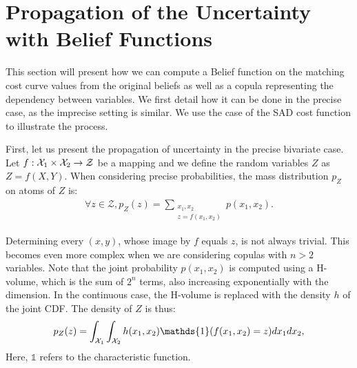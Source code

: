 \section{Propagation of the Uncertainty with Belief Functions}
This section  will present how we can compute a Belief function on the matching cost curve values from the original beliefs as well as a copula representing the dependency between variables. We first detail how it can be done in the precise case, as the imprecise setting is similar. We use the case of the SAD cost function to illustrate the process.

First, let us present the propagation of uncertainty in the precise bivariate case. Let $f:{\mathcal{X}}_1\times{\mathcal{X}}_2\rightarrow\mathcal{Z}$ be a mapping and we define the random variables $Z$ as $Z=f(X,Y)$. 
When considering precise probabilities, the mass distribution $p_Z$ on atoms of $Z$ is:
\begin{align}
    \forall z\in\mathcal{Z}, p_Z(z)=\sum_{\substack{x_1,x_2\\z=f(x_1,x_2)}}p(x_1,x_2).
\end{align}

Determining every $(x,y)$, whose image by $f$ equals $z$, is not always trivial. This becomes even more complex when we are considering copulas with $n>2$ variables. Note that the joint probability $p(x_1,x_2)$ is computed using a H-volume, which is the sum of $2^n$ terms, also increasing exponentially with the dimension. In the continuous case, the H-volume is replaced with the density $h$ of the joint CDF. The density of $Z$ is thus:
\begin{align}
    p_Z(z) = \int_{\X_1}\int_{\X_2}h(x_1,x_2)\mathds{1}(f(x_1,x_2)=z)dx_1dx_2,
\end{align}
Here, $\mathds{1}$ refers to the characteristic function.

